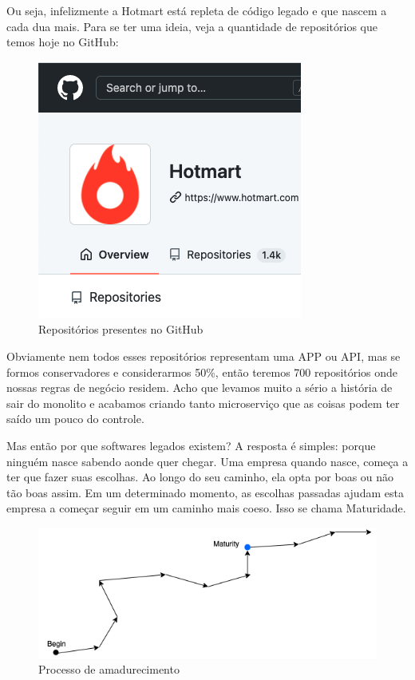\documentclass[a4paper]{article}
\begin{document}
Ou seja, infelizmente a Hotmart está repleta de código legado e que nascem a cada dua mais. Para se ter uma ideia, veja a quantidade de repositórios que temos hoje no GitHub:

\begin{figure}[H]
    \centering
    \includegraphics[scale=1,keepaspectratio=true]{images/01.png}
    \caption{Repositórios presentes no GitHub}
    \label{github_repo}
\end{figure}

Obviamente nem todos esses repositórios representam uma APP ou API, mas se formos conservadores e considerarmos 50\%, então teremos 700 repositórios onde nossas regras de negócio residem. Acho que levamos muito a sério a história de sair do monolito e acabamos criando tanto microserviço que as coisas podem ter saído um pouco do controle.

Mas então por que softwares legados existem? A resposta é simples: porque ninguém nasce sabendo aonde quer chegar. Uma empresa quando nasce, começa a ter que fazer suas escolhas. Ao longo do seu caminho, ela opta por boas ou não tão boas assim. Em um determinado momento, as escolhas passadas ajudam esta empresa a começar seguir em um caminho mais coeso. Isso se chama Maturidade.

\begin{figure}[H]
    \centering
    \includegraphics[scale=0.60,keepaspectratio=true]{images/02.png}
    \caption{Processo de amadurecimento}
    \label{mature_process}
\end{figure}
\end{document}
